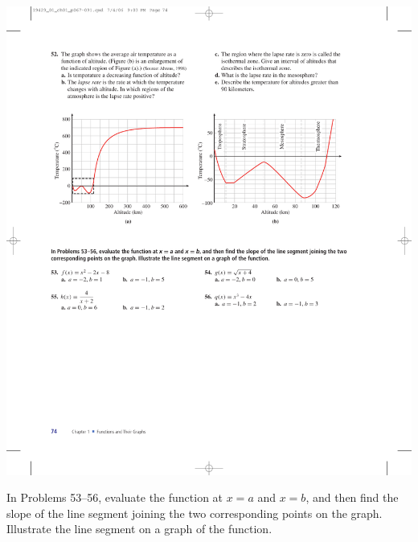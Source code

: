 \documentclass[10pt,]{book}
\theoremstyle{plain}
\theoremstyle{definition}
\theoremstyle{definition}
\theoremstyle{definition}
\theoremstyle{definition}
\numberwithin{equation}{part}
\begin{document}
\begin{exerciselist}
 \includegraphics[width=1\linewidth]{images/fig-ex-1-4-52}
%
\par\smallskip
\end{exerciselist}
\hypertarget{exercisegroup-33}{}\par\noindent In Problems 53–56, evaluate the function at \(x = a\) and \(x = b\), and then find the slope of the line segment joining the two corresponding points on the graph. Illustrate the line segment on a graph of the function.%
\end{document}
